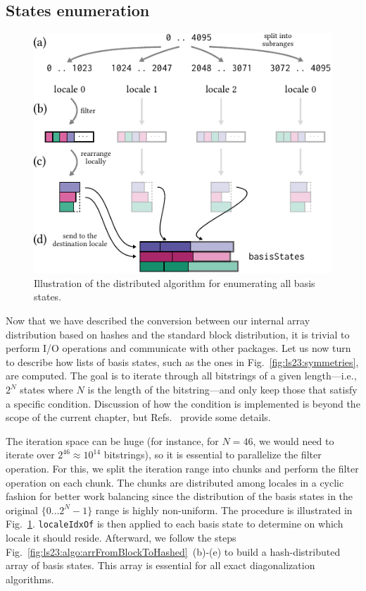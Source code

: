\subsection{States enumeration}\label{sec:ls23:statesEnumeration}

\begin{figure}[h]
    \centering
    \includegraphics[width=0.7\linewidth]{./chapters/Proceedings_PAW_ATM_2023/algo-enumerateStates.pdf}
    \caption{Illustration of the distributed algorithm for enumerating all basis states.}
    \label{fig:ls23:algo:enumerateStates}
\end{figure}

Now that we have described the conversion between our internal array distribution based on hashes and the standard block distribution, it is trivial to perform I/O operations and communicate with other packages. Let us now turn to describe how lists of basis states, such as the ones in Fig.~\ref{fig:ls23:symmetries}, are computed. The goal is to iterate through all bitstrings of a given length---i.e., $2^N$ states where $N$ is the length of the bitstring---and only keep those that satisfy a specific condition. Discussion of how the condition is implemented is beyond the scope of the current chapter, but Refs.~\cite{Wietek2018subla,Sandvi2010ComputationalS} provide some details.

The iteration space can be huge (for instance, for $N=46$, we would need to iterate over $2^{46} \approx 10^{14}$ bitstrings), so it is essential to parallelize the filter operation. For this, we split the iteration range into chunks and perform the filter operation on each chunk. The chunks are distributed among locales in a cyclic fashion for better work balancing since the distribution of the basis states in the original $\{0 \dots 2^N-1\}$ range is highly non-uniform. The procedure is illustrated in Fig.~\ref{fig:ls23:algo:enumerateStates}. \verb|localeIdxOf| is then applied to each basis state to determine on which locale it should reside. Afterward, we follow the steps Fig.~\ref{fig:ls23:algo:arrFromBlockToHashed}~(b)-(e) to build a hash-distributed array of basis states. This array is essential for all exact diagonalization algorithms.

